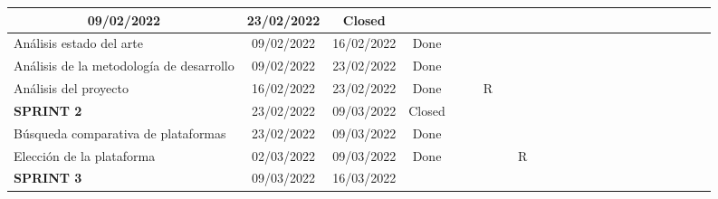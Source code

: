 \begin{landscape}
\begin{table}[h]
{\begin{tabular}{|lccc|l|l|l|l|l|l|l|l|l|l|l|l|l|l|l|l|l|l|l|}
  \multicolumn{1}{c|}{\cellcolor[HTML]{C0C0C0}09/02/2022} &
  \multicolumn{1}{c|}{\cellcolor[HTML]{C0C0C0}23/02/2022} &
  \cellcolor[HTML]{C0C0C0}Closed &
  \cellcolor[HTML]{A1E8A8} &
  \cellcolor[HTML]{A1E8A8} &
   &
   &
   &
   &
   &
   &
   &
   &
   &
   &
   &
   &
   &
   &
   &
   &
   \\ \hline
\multicolumn{1}{|l|}{Análisis estado del arte} &
  \multicolumn{1}{c|}{09/02/2022} &
  \multicolumn{1}{c|}{16/02/2022} &
  Done &
  \cellcolor[HTML]{07BB30} &
  \multicolumn{1}{c|}{} &
   &
   &
   &
   &
   &
   &
   &
   &
   &
   &
   &
   &
   &
   &
   &
   &
   \\ \hline
\multicolumn{1}{|l|}{Análisis de la metodología de desarrollo} &
  \multicolumn{1}{c|}{09/02/2022} &
  \multicolumn{1}{c|}{23/02/2022} &
  Done &
  \cellcolor[HTML]{07BB30} &
  \cellcolor[HTML]{07BB30} &
   &
   &
   &
   &
   &
   &
   &
   &
   &
   &
   &
   &
   &
   &
   &
   &
   \\ \hline
\multicolumn{1}{|l|}{Análisis del proyecto} &
  \multicolumn{1}{c|}{16/02/2022} &
  \multicolumn{1}{c|}{23/02/2022} &
  Done &
   &
  \cellcolor[HTML]{07BB30} &
  \multicolumn{1}{c|}{\cellcolor[HTML]{FFFFC7}R} &
   &
   &
   &
   &
   &
   &
   &
   &
   &
   &
   &
   &
   &
   &
   &
   \\ \hline
\multicolumn{1}{|l|}{\cellcolor[HTML]{C0C0C0}\textbf{SPRINT 2}} &
  \multicolumn{1}{c|}{\cellcolor[HTML]{C0C0C0}23/02/2022} &
  \multicolumn{1}{c|}{\cellcolor[HTML]{C0C0C0}09/03/2022} &
  \cellcolor[HTML]{C0C0C0}Closed &
   &
   &
  \cellcolor[HTML]{A1E8A8} &
  \cellcolor[HTML]{A1E8A8} &
   &
   &
   &
   &
   &
   &
   &
   &
   &
   &
   &
   &
   &
   &
   \\ \hline
\multicolumn{1}{|l|}{Búsqueda comparativa de plataformas} &
  \multicolumn{1}{c|}{23/02/2022} &
  \multicolumn{1}{c|}{09/03/2022} &
  Done &
   &
   &
  \cellcolor[HTML]{07BB30} &
  \cellcolor[HTML]{07BB30} &
   &
   &
   &
   &
   &
   &
   &
   &
   &
   &
   &
   &
   &
   &
   \\ \hline
\multicolumn{1}{|l|}{Elección de la plataforma} &
  \multicolumn{1}{c|}{02/03/2022} &
  \multicolumn{1}{c|}{09/03/2022} &
  Done &
   &
   &
   &
  \cellcolor[HTML]{07BB30} &
  \multicolumn{1}{c|}{\cellcolor[HTML]{FFFFC7}R} &
   &
   &
   &
   &
   &
   &
   &
   &
   &
   &
   &
   &
   &
   \\ \hline
\multicolumn{1}{|l|}{\cellcolor[HTML]{C0C0C0}\textbf{SPRINT 3}} &
  \multicolumn{1}{c|}{\cellcolor[HTML]{C0C0C0}09/03/2022} &
  \multicolumn{1}{c|}{\cellcolor[HTML]{C0C0C0}16/03/2022} &

\end{tabular}}
\end{table}
\end{landscape}
